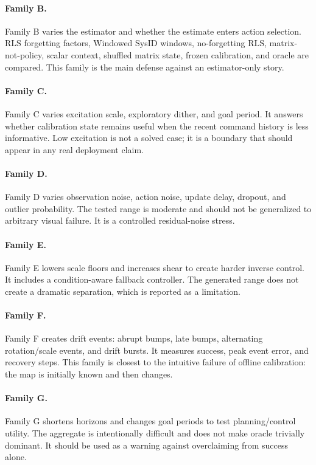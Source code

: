 \documentclass{article}
\begin{document}
\paragraph{Family B.}
Family B varies the estimator and whether the estimate enters action
selection. RLS forgetting factors, Windowed SysID windows, no-forgetting RLS,
matrix-not-policy, scalar context, shuffled matrix state, frozen calibration,
and oracle are compared. This family is the main defense against an
estimator-only story.

\paragraph{Family C.}
Family C varies excitation scale, exploratory dither, and goal period. It
answers whether calibration state remains useful when the recent command
history is less informative. Low excitation is not a solved case; it is a
boundary that should appear in any real deployment claim.

\paragraph{Family D.}
Family D varies observation noise, action noise, update delay, dropout, and
outlier probability. The tested range is moderate and should not be generalized
to arbitrary visual failure. It is a controlled residual-noise stress.

\paragraph{Family E.}
Family E lowers scale floors and increases shear to create harder inverse
control. It includes a condition-aware fallback controller. The generated range
does not create a dramatic separation, which is reported as a limitation.

\paragraph{Family F.}
Family F creates drift events: abrupt bumps, late bumps, alternating
rotation/scale events, and drift bursts. It measures success, peak event error,
and recovery steps. This family is closest to the intuitive failure of offline
calibration: the map is initially known and then changes.

\paragraph{Family G.}
Family G shortens horizons and changes goal periods to test planning/control
utility. The aggregate is intentionally difficult and does not make oracle
trivially dominant. It should be used as a warning against overclaiming from
success alone.
\end{document}
